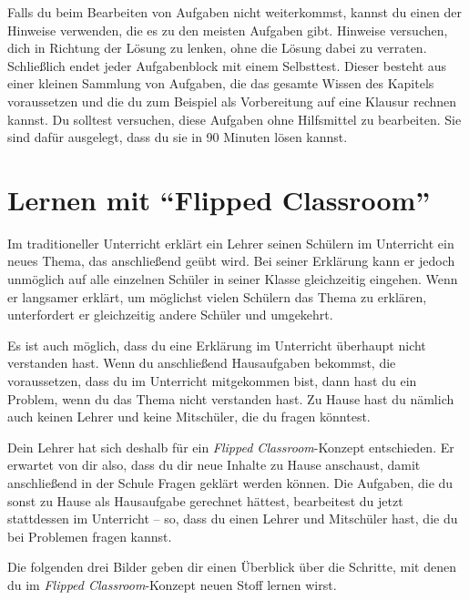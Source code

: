 \documentclass[../main.tex]{subfiles}
\begin{document}
Falls du beim Bearbeiten von Aufgaben nicht weiterkommst, kannst du einen der Hinweise verwenden, die es zu den meisten Aufgaben gibt. Hinweise versuchen, dich in Richtung der Lösung zu lenken, ohne die Lösung dabei zu verraten. Schließlich endet jeder Aufgabenblock mit einem Selbsttest. Dieser besteht aus einer kleinen Sammlung von Aufgaben, die das gesamte Wissen des Kapitels voraussetzen und die du zum Beispiel als Vorbereitung auf eine Klausur rechnen kannst. Du solltest versuchen, diese Aufgaben ohne Hilfsmittel zu bearbeiten. Sie sind dafür ausgelegt, dass du sie in 90 Minuten lösen kannst.

\newpage

\section*{Lernen mit \enquote{Flipped Classroom}}
Im traditioneller Unterricht erklärt ein Lehrer seinen Schülern im Unterricht ein neues Thema, das anschließend geübt wird. Bei seiner Erklärung kann er jedoch unmöglich auf alle einzelnen Schüler in seiner Klasse gleichzeitig eingehen. Wenn er langsamer erklärt, um möglichst vielen Schülern das Thema zu erklären, unterfordert er gleichzeitig andere Schüler und umgekehrt.

Es ist auch möglich, dass du eine Erklärung im Unterricht überhaupt nicht verstanden hast. Wenn du anschließend Hausaufgaben bekommst, die voraussetzen, dass du im Unterricht mitgekommen bist, dann hast du ein Problem, wenn du das Thema nicht verstanden hast. Zu Hause hast du nämlich auch keinen Lehrer und keine Mitschüler, die du fragen könntest.

Dein Lehrer hat sich deshalb für ein \emph{Flipped Classroom}-Konzept entschieden. Er erwartet von dir also, dass du dir neue Inhalte zu Hause anschaust, damit anschließend in der Schule Fragen geklärt werden können. Die Aufgaben, die du sonst zu Hause als Hausaufgabe gerechnet hättest, bearbeitest du jetzt stattdessen im Unterricht -- so, dass du einen Lehrer und Mitschüler hast, die du bei Problemen fragen kannst. 

Die folgenden drei Bilder geben dir einen Überblick über die Schritte, mit denen du im \emph{Flipped Classroom}-Konzept neuen Stoff lernen wirst.
\end{document}
